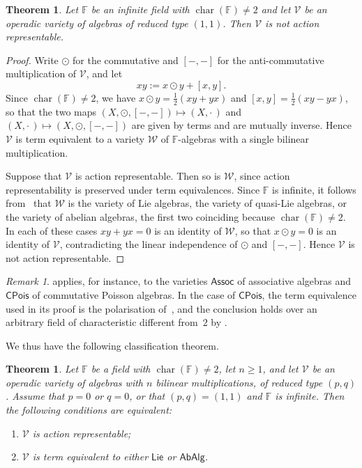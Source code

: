 \documentclass[reqno,a4paper]{amsart}
\theoremstyle{plain}
\newtheorem{theorem}[subsection]{Theorem}
\theoremstyle{definition}
\theoremstyle{remark}
\newtheorem{remark}[subsection]{Remark}
\numberwithin{equation}{section}
\newenvironment{tfae}
{\renewcommand{\labelenumi}{(\roman{enumi})}
\begin{enumerate}}
{\end{enumerate}}
\newcommand{\F}{\mathbb{F}}
\newcommand{\V}{\mathcal{V}}
\newcommand{\W}{\mathcal{W}}
\DeclareMathOperator{\bchar}{char}
\newcommand{\Assoc}{\ensuremath{\mathsf{Assoc}}}
\newcommand{\Lie}{\ensuremath{\mathsf{Lie}}}
\newcommand{\CPois}{\ensuremath{\mathsf{CPois}}}
\newcommand{\AbAlg}{\ensuremath{\mathsf{AbAlg}}}
\begin{document}
\begin{theorem}\cite{Tim}\label{TheoremMixedNotAR}
Let $\F$ be an infinite field with $\bchar(\F)\neq2$ and let $\V$ be an operadic variety of algebras of reduced type $(1,1)$. Then $\V$ is not action representable.
\end{theorem}

\begin{proof}
Write $\odot$ for the commutative and $[-,-]$ for the anti-commutative multiplication of $\V$, and let
\[
xy:=x\odot y+[x,y].
\]
Since $\bchar(\F)\neq2$, we have $x\odot y=\tfrac12(xy+yx)$ and $[x,y]=\tfrac12(xy-yx)$, so that the two maps $(X,\odot,[-,-])\mapsto(X,\cdot\,)$ and $(X,\cdot\,)\mapsto(X,\odot,[-,-])$ are given by terms and are mutually inverse. Hence $\V$ is term equivalent to a variety $\W$ of $\F$-algebras with a single bilinear multiplication.

Suppose that $\V$ is action representable. Then so is $\W$, since action representability is preserved under term equivalences. Since $\F$ is infinite, it follows from~\cite[Theorem~6.1]{Tim} that $\W$ is the variety of Lie algebras, the variety of quasi-Lie algebras, or the variety of abelian algebras, the first two coinciding because $\bchar(\F)\neq2$. In each of these cases $xy+yx=0$ is an identity of $\W$, so that $x\odot y=0$ is an identity of $\V$, contradicting the linear independence of $\odot$ and $[-,-]$. Hence $\V$ is not action representable.
\end{proof}

\begin{remark}\label{RemarkMixedExamples}
 applies, for instance, to the varieties $\Assoc$ of associative algebras and $\CPois$ of commutative Poisson algebras. In the case of $\CPois$, the term equivalence used in its proof is the polarisation of~\cite{MarklRemm}, and the conclusion holds over an arbitrary field of characteristic different from~$2$ by .
\end{remark}

We thus have the following classification theorem.

\begin{theorem}\label{TheoremNLieBracketsAR2}
Let $\F$ be a field with $\bchar(\F)\neq2$, let $n\geq1$, and let $\V$ be an operadic variety of algebras with $n$ bilinear multiplications, of reduced type $(p,q)$. Assume that $p=0$ or $q=0$, or that $(p,q)=(1,1)$ and $\F$ is infinite. Then the following conditions are equivalent:
\begin{tfae}
\item $\V$ is action representable;
\item $\V$ is term equivalent to either $\Lie$ or $\AbAlg$.
\end{tfae}
\end{theorem}
\end{document}
